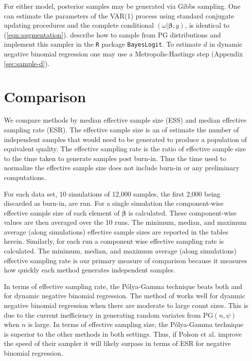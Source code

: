\documentclass[11pt]{article}
\newcommand{\Polya}{P\'{o}lya}
\newcommand{\PG}{\text{PG}}
\newcommand{\bbeta}{\boldsymbol{\beta}}
\begin{document}
For either model, posterior samples may be generated via Gibbs sampling.  One
can estimate the parameters of the VAR(1) process using standard conjugate
updating procedures and the complete conditional $(\omega | \bbeta, y)$, is
identical to (\ref{eqn:augmentation}).  \cite{polson-etal-2012} describe how to
sample from $\PG$ distributions and implement this sampler in the \texttt{R}
package \texttt{BayesLogit}.  To estimate $d$ in dynamic negative binomial
regression one may use a Metropolis-Hastings step (Appendix \ref{sec:sample-d}).

\section{Comparison}

We compare methods by median effective sample size (ESS) and median effective
sampling rate (ESR).  The effective sample size is an of estimate the number of
independent samples that would need to be generated to produce a population of
equivalent quality.  The effective sampling rate is the ratio of effective
sample size to the time taken to generate samples post burn-in.  Thus the time
used to normalize the effective sample size does not include burn-in or any
preliminary computations.

For each data set, 10 simulations of 12,000 samples, the first 2,000 being
discarded as burn-in, are run.  For a single simulation the component-wise
effective sample size of each element of $\bbeta$ is calculated.  These
component-wise values are then averaged over the 10 runs.  The minimum, median,
and maximum average (along simulations) effective sample sizes are reported in
the tables herein.  Similarly, for each run a component wise effective sampling
rate is calculated.  The minimum, median, and maximum average (along
simulations) effective sampling rate is our primary measure of comparison
because it measures how quickly each method generates independent samples.

In terms of effective sampling rate, the \Polya-Gamma technique beats both
\cite{ravines-etal-2006} and \cite{fussl-etal-2013} for dynamic negative
binomial regression.  The method of \cite{fruhwirth-schnatter-etal-2009} works
well for dyanmic negative binomial regression when there are moderate to large
count sizes.  This is due to the current inefficiency in generating random
variates from $\PG(n, \psi)$ when $n$ is large.  In terms of effective sampling
size, the \Polya-Gamma technique is superior to the other methods in both
settings.  Thus, if Polson et al. improve the speed of their sampler it will
likely surpass \cite{fussl-etal-2013} in terms of ESR for negative binomial
regression.
\end{document}
